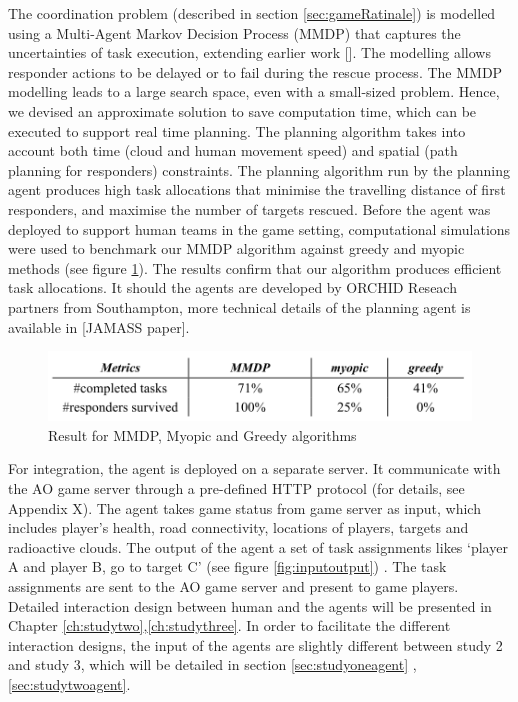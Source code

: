 The coordination problem (described in section \ref{sec:gameRatinale}) is modelled using a Multi-Agent Markov Decision Process (MMDP) that captures the uncertainties of task execution, extending earlier work []. The modelling allows responder actions to be delayed or to fail during the rescue process. The MMDP modelling leads to a large search space, even with a small-sized problem. Hence, we devised an approximate solution to save computation time, which can be executed to support real time planning. The planning algorithm takes into account both time (cloud and human movement speed) and spatial (path planning for responders) constraints. The planning algorithm run by the planning agent produces high task allocations that minimise the travelling distance of first responders, and maximise the number of targets rescued. Before the agent was deployed to support human teams in the game setting, computational simulations were used to benchmark our MMDP algorithm against greedy and myopic methods (see figure \ref{fig:agentBenchmarking}). The results confirm that our algorithm produces efficient task allocations. It should the agents are developed by ORCHID Reseach partners from Southampton, more technical details of the planning agent is available in [JAMASS paper].\\

\begin{figure}[h]
  \centering
  \includegraphics[width=1\textwidth]{img/approach/agentBenchmarking}
  \caption{Result for MMDP, Myopic and Greedy algorithms}
  \label{fig:agentBenchmarking}
\end{figure}

For integration, the agent is deployed on a separate server. It communicate with the AO game server through a pre-defined HTTP protocol (for details, see Appendix X). The agent takes game status from game server as input, which includes player's health, road connectivity, locations of players, targets and radioactive clouds. The output of the agent a set of task assignments likes `player A and player B, go to target C' (see figure \ref{fig:inputoutput}) . The task assignments are sent to the AO game server and present to game players. Detailed interaction design between human and the agents will be presented in Chapter \ref{ch:studytwo},\ref{ch:studythree}. In order to facilitate the different interaction designs, the input of the agents are slightly different between study 2 and study 3, which will be detailed in section \ref{sec:studyoneagent} , \ref{sec:studytwoagent}. \\

